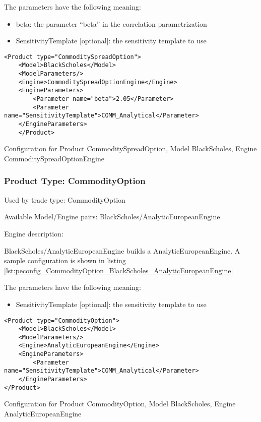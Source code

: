 The parameters have the following meaning:

\begin{itemize}
\item beta: the parameter ``beta'' in the correlation parametrization
\item SensitivityTemplate [optional]: the sensitivity template to use 
\end{itemize}

\begin{longlisting}
\begin{verbatim}
<Product type="CommoditySpreadOption">
    <Model>BlackScholes</Model>
    <ModelParameters/>
    <Engine>CommoditySpreadOptionEngine</Engine>
    <EngineParameters>
        <Parameter name="beta">2.05</Parameter>
        <Parameter name="SensitivityTemplate">COMM_Analytical</Parameter>
    </EngineParameters>
    </Product>
\end{verbatim}
\caption{Configuration for Product CommoditySpreadOption, Model BlackScholes, Engine CommoditySpreadOptionEngine}
\label{lst:peconfig_CommoditySpreadOption_BlackScholes_CommoditySpreadOptionEngine}
\end{longlisting}

\subsubsection{Product Type: CommodityOption}

Used by trade type: CommodityOption

Available Model/Engine pairs: BlackScholes/AnalyticEuropeanEngine

Engine description:

BlackScholes/AnalyticEuropeanEngine builds a AnalyticEuropeanEngine. A sample configuration is shown in listing
\ref{lst:peconfig_CommodityOption_BlackScholes_AnalyticEuropeanEngine}

The parameters have the following meaning:

\begin{itemize}
\item SensitivityTemplate [optional]: the sensitivity template to use 
\end{itemize}

\begin{longlisting}
\begin{verbatim}
<Product type="CommodityOption">
    <Model>BlackScholes</Model>
    <ModelParameters/>
    <Engine>AnalyticEuropeanEngine</Engine>
    <EngineParameters>
        <Parameter name="SensitivityTemplate">COMM_Analytical</Parameter>
    </EngineParameters>
</Product>
\end{verbatim}
\caption{Configuration for Product CommodityOption, Model BlackScholes, Engine AnalyticEuropeanEngine}
\label{lst:peconfig_CommodityOption_BlackScholes_AnalyticEuropeanEngine}
\end{longlisting}

